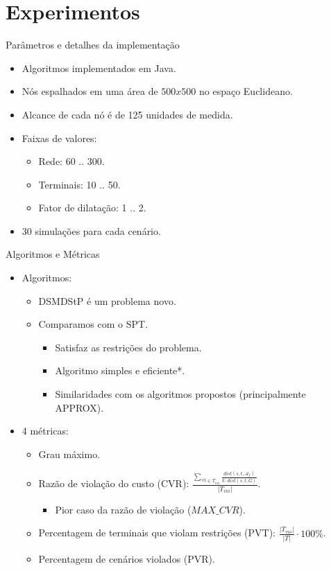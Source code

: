 \documentclass[10pt]{beamer}
\begin{document}
\section{Experimentos}
\begin{frame}{Parâmetros e detalhes da implementação}
  \begin{itemize}
    \item Algoritmos implementados em Java.
    \item Nós espalhados em uma área de $500 x 500$ no espaço Euclideano.
    \item Alcance de cada nó é de 125 unidades de medida.
    \item Faixas de valores:
    \begin{itemize}
      \item Rede: 60 .. 300.
      \item Terminais: 10 .. 50.
      \item Fator de dilatação: 1 .. 2.
    \end{itemize}
    \item 30 simulações para cada cenário.
  \end{itemize}
\end{frame}

\begin{frame}{Algoritmos e Métricas}
\begin{itemize}
  \item <2-> Algoritmos:
  \begin{itemize}
    \item DSMDStP é um problema novo.
    \item Comparamos com o SPT.
    \begin{itemize}
      \item Satisfaz as restrições do problema.
      \item Algoritmo simples e eficiente*.
      \item Similaridades com os algoritmos propostos (principalmente APPROX).
    \end{itemize}
  \end{itemize}
  \item <3-> 4 métricas:
  \begin{itemize}
    \item <4-> Grau máximo.
    \item <5-> Razão de violação do custo (CVR): $\frac{\sum_{\forall t \in T_{vio}}\frac{dist(s,t,\mathcal{A}_f)}{k \cdot dist(s,t,G)}}{|T_{vio}|}$.
    \begin{itemize}
      \item Pior caso da razão de violação ($MAX\_CVR$).
    \end{itemize}
    \item <6-> Percentagem de terminais que violam restrições (PVT): $\frac{|T_{vio}|}{|T|} \cdot 100 \%$.
    \item <7-> Percentagem de cenários violados (PVR).
  \end{itemize}
\end{itemize}
\end{frame}
\end{document}
